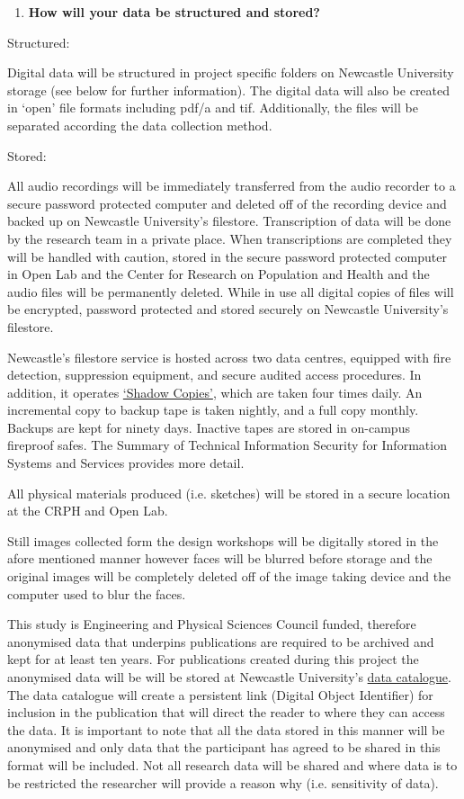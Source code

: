 \begin{enumerate}[resume]
\item \textbf{How will your data be structured and stored?} 
\end{enumerate}
Structured: 

Digital data will be structured in project specific folders on Newcastle University storage (see below for further information). The digital data will also be created in ‘open’ file formats including pdf/a and tif. Additionally, the files will be separated according the data collection method.

Stored: 

All audio recordings will be immediately transferred from the audio recorder to a secure password protected computer and deleted off of the recording device and backed up on Newcastle University’s filestore. Transcription of data will be done by the research team in a private place. When transcriptions are completed they will be handled with caution, stored in the secure password protected computer in Open Lab and the Center for Research on Population and Health and the audio files will be permanently deleted. While in use all digital copies of files will be encrypted, password protected and stored securely on Newcastle University’s filestore.

Newcastle’s filestore service is hosted across two data centres, equipped with fire detection, suppression equipment, and secure audited access procedures. In addition, it operates \href{https://services.ncl.ac.uk/itservice/core-services/filestore/shadowcopy/}{`Shadow Copies'}, which are taken four times daily. An incremental copy to backup tape is taken nightly, and a full copy monthly. Backups are kept for ninety days. Inactive tapes are stored in on-campus fireproof safes. The Summary of Technical Information Security for Information Systems and Services provides more detail.  

All physical materials produced (i.e. sketches) will be stored in a secure location at the CRPH and Open Lab. 

Still images collected form the design workshops will be digitally stored in the afore mentioned manner however faces will be blurred before storage and the original images will be completely deleted off of the image taking device and the computer used to blur the faces.

This study is Engineering and Physical Sciences Council funded, therefore anonymised data that underpins publications are required to be archived and kept for at least ten years. For publications created during this project the anonymised data will be will be stored at Newcastle University’s \href{https://data.ncl.ac.uk}{data catalogue}. The data catalogue will create a persistent link (Digital Object Identifier) for inclusion in the publication that will direct the reader to where they can access the data. It is important to note that all the data stored in this manner will be anonymised and only data that the participant has agreed to be shared in this format will be included. Not all research data will be shared and where data is to be restricted the researcher will provide a reason why (i.e. sensitivity of data). 

